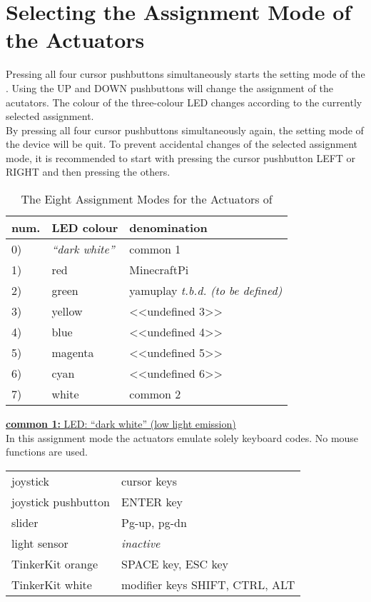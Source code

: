 \section{Selecting the Assignment Mode of the Actuators}
\label{sect:assignment}
Pressing all four cursor pushbuttons simultaneously starts the
setting mode of the {\Bezeichnung}. Using the UP and DOWN pushbuttons
will change the assignment of the acutators. The colour of the
three-colour LED changes according to the currently selected
assignment.\\
By pressing all four cursor pushbuttons simultaneously again, the
setting mode of the device will be quit. To prevent accidental changes
of the selected assignment mode, it is recommended to start with
pressing the cursor pushbutton LEFT or RIGHT and then pressing the
others.

\begin{table}[h]
\centering
\renewcommand{\arraystretch}{1.5}
\begin{tabular}{|p{}|p{}|p{}|}
\hline
\textbf{num.}		&	\textbf{LED colour}		&	\textbf{denomination}\\
\hline
		0)			&	\textit{``dark white''}	&	common 1\\
\hline
		1)			&	red						&	MinecraftPi\\
\hline
		2)			&	green					&	yamuplay \textit{t.b.d. (to be defined)}\\
\hline
		3)			&	yellow					&	<<undefined 3>>\\
\hline
		4)			&	blue					&	<<undefined 4>>\\
\hline
		5)			&	magenta					&	<<undefined 5>>\\
\hline
		6)			&	cyan					&	<<undefined 6>>\\
\hline
		7)			&	white					&	common 2\\
\hline
\end{tabular}
\vspace{0.5cm}
\caption{The Eight Assignment Modes for the Actuators of \Bezeichnung}
\end{table}
 
\uline{\textbf{common 1: } LED: ``dark white'' (low light emission)}\\
In this assignment mode the actuators emulate solely keyboard codes. No
mouse functions are used.

\begin{tabular}{ll}
	joystick			&	cursor keys\\
	joystick pushbutton	&	ENTER key\\
	slider				&	Pg-up, pg-dn\\
	light sensor		&	\textit{inactive}\\
	TinkerKit orange	&	SPACE key, ESC key\\
	TinkerKit white		&	modifier keys SHIFT, CTRL, ALT\\
\end{tabular}


